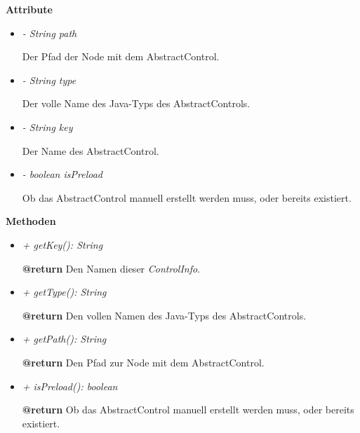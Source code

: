         \textbf{Attribute}
        \begin{itemize}
            \item \textit{- String path}
                \begin{leftbar}[0.9\linewidth]
                    Der Pfad der Node mit dem AbstractControl.
                \end{leftbar}
            \item \textit{- String type}
                \begin{leftbar}[0.9\linewidth]
                    Der volle Name des Java-Typs des AbstractControls.
                \end{leftbar}
            \item \textit{- String key}
                \begin{leftbar}[0.9\linewidth]
                    Der Name des AbstractControl.
                \end{leftbar}
            \item \textit{- boolean isPreload}
                \begin{leftbar}[0.9\linewidth]
                    Ob das AbstractControl manuell erstellt werden muss, oder bereits existiert.
                \end{leftbar}
        \end{itemize}
        \textbf{Methoden}
        \begin{itemize}
            \item \textit{+ getKey(): String}
                \begin{leftbar}[0.9\linewidth]
                    \textbf{@return} Den Namen dieser \textit{ControlInfo}.
                \end{leftbar}
            \item \textit{+ getType(): String}
                \begin{leftbar}[0.9\linewidth]
                    \textbf{@return} Den vollen Namen des Java-Typs des AbstractControls.
                \end{leftbar}
            \item \textit{+ getPath(): String}
                \begin{leftbar}[0.9\linewidth]
                    \textbf{@return} Den Pfad zur Node mit dem AbstractControl.
                \end{leftbar}
            \item \textit{+ isPreload(): boolean}
                \begin{leftbar}[0.9\linewidth]
                    \textbf{@return} Ob das AbstractControl manuell erstellt werden muss, oder bereits existiert.
                \end{leftbar}
        \end{itemize}

\pagebreak